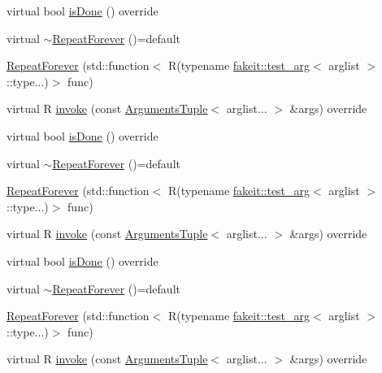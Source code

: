 \begin{DoxyCompactItemize}
\item 
virtual bool \mbox{\hyperlink{structfakeit_1_1RepeatForever_af5922669a521e99ca18218972b86cb87}{is\+Done}} () override
\item 
virtual \mbox{\hyperlink{structfakeit_1_1RepeatForever_ae4c256607ab407cea8403d49538cb320}{$\sim$\+Repeat\+Forever}} ()=default
\item 
\mbox{\hyperlink{structfakeit_1_1RepeatForever_a4f3eb9d8eda23dcc882ab5363466a379}{Repeat\+Forever}} (std\+::function$<$ R(typename \mbox{\hyperlink{structfakeit_1_1test__arg}{fakeit\+::test\+\_\+arg}}$<$ arglist $>$\+::type...)$>$ func)
\item 
virtual R \mbox{\hyperlink{structfakeit_1_1RepeatForever_a9fcab18dc26a1f74a22e82a775f06ea6}{invoke}} (const \mbox{\hyperlink{namespacefakeit_a476a37a598825e1b5dd67b3a176491a1}{Arguments\+Tuple}}$<$ arglist... $>$ \&args) override
\item 
virtual bool \mbox{\hyperlink{structfakeit_1_1RepeatForever_af5922669a521e99ca18218972b86cb87}{is\+Done}} () override
\item 
virtual \mbox{\hyperlink{structfakeit_1_1RepeatForever_ae4c256607ab407cea8403d49538cb320}{$\sim$\+Repeat\+Forever}} ()=default
\item 
\mbox{\hyperlink{structfakeit_1_1RepeatForever_a4f3eb9d8eda23dcc882ab5363466a379}{Repeat\+Forever}} (std\+::function$<$ R(typename \mbox{\hyperlink{structfakeit_1_1test__arg}{fakeit\+::test\+\_\+arg}}$<$ arglist $>$\+::type...)$>$ func)
\item 
virtual R \mbox{\hyperlink{structfakeit_1_1RepeatForever_a9fcab18dc26a1f74a22e82a775f06ea6}{invoke}} (const \mbox{\hyperlink{namespacefakeit_a476a37a598825e1b5dd67b3a176491a1}{Arguments\+Tuple}}$<$ arglist... $>$ \&args) override
\item 
virtual bool \mbox{\hyperlink{structfakeit_1_1RepeatForever_af5922669a521e99ca18218972b86cb87}{is\+Done}} () override
\item 
virtual \mbox{\hyperlink{structfakeit_1_1RepeatForever_ae4c256607ab407cea8403d49538cb320}{$\sim$\+Repeat\+Forever}} ()=default
\item 
\mbox{\hyperlink{structfakeit_1_1RepeatForever_a4f3eb9d8eda23dcc882ab5363466a379}{Repeat\+Forever}} (std\+::function$<$ R(typename \mbox{\hyperlink{structfakeit_1_1test__arg}{fakeit\+::test\+\_\+arg}}$<$ arglist $>$\+::type...)$>$ func)
\item 
virtual R \mbox{\hyperlink{structfakeit_1_1RepeatForever_a9fcab18dc26a1f74a22e82a775f06ea6}{invoke}} (const \mbox{\hyperlink{namespacefakeit_a476a37a598825e1b5dd67b3a176491a1}{Arguments\+Tuple}}$<$ arglist... $>$ \&args) override

\end{DoxyCompactItemize}
